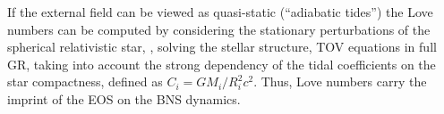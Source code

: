 %
%
If the external field can be viewed as quasi-static (``adiabatic tides'') the 
Love numbers can be computed by considering the stationary perturbations of the spherical 
relativistic star, \ie, solving the stellar structure, \ac{TOV} equations in full \ac{GR}, 
taking into account the strong dependency of the tidal coefficients on the star compactness, defined as 
$C_{i} = GM_i/R_i^2c^2$. 
%
Thus, Love numbers carry the imprint of the \ac{EOS} on the \ac{BNS} dynamics.
%
%


